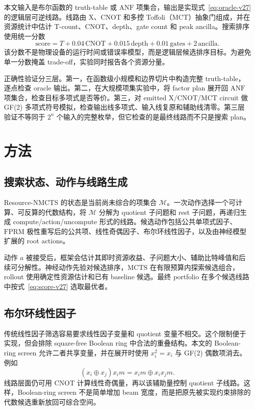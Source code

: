 \documentclass[UTF8,fontset=macnew,11pt]{ctexart}
\newcommand{\method}{Resource-NMCTS}
\newcommand{\screen}{Boolean-ring screen}
\newcommand{\anf}{\ensuremath{\mathrm{ANF}}}
\newcommand{\fprm}{\ensuremath{\mathrm{FPRM}}}
\newcommand{\mcts}{\ensuremath{\mathrm{MCTS}}}
\newcommand{\xor}{\ensuremath{\oplus}}
\newcommand{\score}{\ensuremath{\mathrm{score}}}
\newcommand{\ttable}{truth-table}
\newcommand{\mct}{\ensuremath{\mathrm{MCT}}}
\begin{document}
本文输入是布尔函数的 \ttable{} 或 \anf{} 项集合，输出是实现式~\eqref{eq:oracle-v27} 的逻辑层可逆线路。线路由 X、CNOT 和多控 Toffoli（\mct{}）抽象门组成，并在资源统计中估计 T-count、CNOT、depth、gate count 和 peak ancilla。搜索排序使用统一分数
\begin{equation}
  \score = T + 0.04\,\mathrm{CNOT} + 0.015\,\mathrm{depth}
         + 0.01\,\mathrm{gates} + 2\,\mathrm{ancilla}.
  \label{eq:score-v27}
\end{equation}
该分数不是物理设备的运行时间或错误率模型，而是逻辑层候选排序目标。为避免单一分数掩盖 trade-off，实验同时报告各个资源分量。

正确性验证分三层。第一，在函数级小规模和边界切片中构造完整 \ttable{}，逐点检查 oracle 输出。第二，在大规模项集实验中，将 factor plan 展开回 \anf{} 项集合，检查目标多项式是否等价。第三，对 emitted X/CNOT/\mct{} circuit 做 GF(2) 多项式符号模拟，检查输出线多项式、输入线复原和辅助线清零。第三层验证不等同于 $2^n$ 个输入的完整枚举，但它检查的是最终线路而不只是搜索 plan。

\section{方法}

\subsection{搜索状态、动作与线路生成}

\method{} 的状态是当前尚未综合的项集合 $\mathcal{M}$。一次动作选择一个可计算、可反算的代数结构，将 $\mathcal{M}$ 分解为 quotient 子问题和 rest 子问题，再递归生成 compute/action/uncompute 形式的线路。候选动作包括公共单项式因子、\fprm{} 极性重写后的公共项、线性奇偶因子、布尔环线性因子，以及由神经模型扩展的 root actions。

动作 $a$ 被接受后，框架会估计其即时资源收益、子问题大小、辅助比特峰值和后续可分解性。神经动作先验对候选排序，\mcts{} 在有限预算内探索候选组合，rollout 使用确定性资源估计和已有 baseline 候选。最终 portfolio 在多个候选线路中按式~\eqref{eq:score-v27} 选取最优者。

\subsection{布尔环线性因子}

传统线性因子筛选容易要求线性因子变量和 quotient 变量不相交。这个限制便于实现，但会排除 square-free Boolean ring 中合法的重叠结构。本文的 \screen{} 允许二者共享变量，并在展开时使用 $x_i^2=x_i$ 与 GF(2) 偶数项消去。例如
\begin{equation}
  (x_i\xor x_j)x_i m = x_i m \xor x_i x_j m .
  \label{eq:boolean-ring-v27}
\end{equation}
线路层面仍可用 CNOT 计算线性奇偶量，再以该辅助量控制 quotient 子线路。这样，\screen{} 不是简单增加 beam 宽度，而是把原先被实现约束排除的代数候选重新放回可综合空间。
\end{document}
